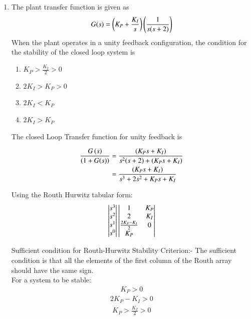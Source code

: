 \begin{enumerate}[label=\thesection.\arabic*.,ref=\thesection.\theenumi]

\item The plant transfer function is given as
\begin{align}
G(s) = \brak{K_{P} + \frac{K_{I}}{s}}\brak{\frac{1}{s(s+2)}}
\label{eq:ee17btech11031_system1}
\end{align}
When the plant operates in a unity feedback configuration, the condition for the stability of the closed loop system is
 \begin{enumerate}
     \item $K_P > \frac{K_I}{2} > 0$
     \item $2K_I > K_P > 0$
     \item $2K_I < K_P$
     \item $2K_I > K_P$
 \end{enumerate} 

\solution The closed Loop Transfer function for unity feedback is

\begin{align}
\frac{G\brak{s}}{\brak{1 + G(s)}} &= \frac{\brak{K_{P}s + K_{I}}}{s^2(s+2) + \brak{K_{P}s + K_{I}}}
\label{eq:ee17btech11031_system}
\\
&= \frac{(K_{P}s + K_{I})}{s^3 + 2s^2 + K_{P}s + K_{I}}
\label{eq:ee17btech11031_system}
\end{align}

Using the Routh Hurwitz tabular form:
\begin{align}
\begin{vmatrix}s^3\\s^2\\s^1\\s^0\end{vmatrix}
\begin{vmatrix}1 & K_{P} \\ 2 & K_{I} \\ \frac{2K_{P} - K_{I}}{2} & 0 \\ K_{P}\end{vmatrix}
\end{align}

Sufficient condition for Routh-Hurwitz Stability Criterion:- The sufficient condition is that all the elements of the first column of the Routh array should have the same sign.
\\
For a system to be stable: 
\begin{align}
K_{P} > 0
\label{eq:ee17btech11031_cond}
\end{align}
\begin{align}
2K_{P} - K_{I} > 0
\label{eq:ee17btech11031_cond} 
\end{align}
\begin{align}
K_{P} > \frac{K_{I}}{2} > 0
\label{eq:ee17btech11031_cond} 
\end{align}


\end{enumerate}
